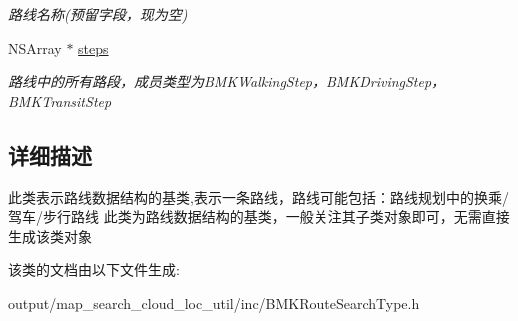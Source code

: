 \begin{DoxyCompactItemize}
\begin{DoxyCompactList}\small\item\em 路线名称(预留字段，现为空) \end{DoxyCompactList}\item 
\hypertarget{interface_b_m_k_route_line_a181c231815114b03dfc858ac26a0168a}{N\+S\+Array $\ast$ \hyperlink{interface_b_m_k_route_line_a181c231815114b03dfc858ac26a0168a}{steps}}\label{interface_b_m_k_route_line_a181c231815114b03dfc858ac26a0168a}

\begin{DoxyCompactList}\small\item\em 路线中的所有路段，成员类型为\+B\+M\+K\+Walking\+Step，\+B\+M\+K\+Driving\+Step，\+B\+M\+K\+Transit\+Step \end{DoxyCompactList}\end{DoxyCompactItemize}


\subsection{详细描述}
此类表示路线数据结构的基类,表示一条路线，路线可能包括：路线规划中的换乘/驾车/步行路线 此类为路线数据结构的基类，一般关注其子类对象即可，无需直接生成该类对象 

该类的文档由以下文件生成\+:\begin{DoxyCompactItemize}
\item 
output/map\+\_\+search\+\_\+cloud\+\_\+loc\+\_\+util/inc/B\+M\+K\+Route\+Search\+Type.\+h\end{DoxyCompactItemize}
